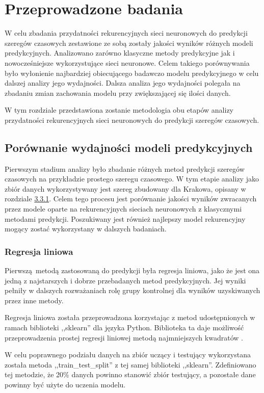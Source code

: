 \documentclass[10pt,a4paper]{article}
\begin{document}
\newpage
\section{Przeprowadzone badania}
W celu zbadania przydatności rekurencyjnych sieci neuronowych do predykcji szeregów czasowych zestawione ze sobą zostały jakości wyników różnych modeli predykcyjnych. Analizowano zarówno klasyczne metody predykcyjne jak i nowocześniejsze wykorzystujące sieci neuronowe. Celem takiego porównywania było wyłonienie najbardziej obiecującego badawczo modelu predykcyjnego w celu dalszej analizy jego wydajności. Dalsza analiza jego wydajności polegała na zbadaniu zmian zachowania modelu przy zwiększającej się ilości danych. 

W tym rozdziale przedstawiona zostanie metodologia obu etapów analizy przydatności rekurencyjnych sieci neuronowych do predykcji szeregów czasowych. 
\subsection{Porównanie wydajności modeli predykcyjnych}
Pierwszym stadium analizy było zbadanie różnych metod predykcji szeregów czasowych na przykładzie prostego szeregu czasowego. W tym etapie analizy jako zbiór danych wykorzystywany jest szereg zbudowany dla Krakowa, opisany w rozdziale \hyperlink{subsubsection.3.3.1}{3.3.1}. Celem tego procesu jest porównanie jakości wyników zwracanych przez modele oparte na rekurencyjnych sieciach neuronowych z klasycznymi metodami predykcji. Poszukiwany jest również najlepszy model rekurencyjny mogący zostać wykorzystany w dalszych badaniach. 

\subsubsection{Regresja liniowa}
Pierwszą metodą zastosowaną do predykcji była regresja liniowa, jako że jest ona jedną z najstarszych i dobrze przebadanych metod predykcyjnych. Jej wyniki pełniły w dalszych rozważaniach rolę grupy kontrolnej dla wyników uzyskiwanych przez inne metody.

Regresja liniowa została przeprowadzona korzystając z metod udostępnionych w ramach biblioteki ,,sklearn'' dla języka Python. Biblioteka ta daje możliwość przeprowadzenia prostej regresji liniowej metodą najmniejszych kwadratów \cite{sklearnLinearRegression}.

W celu poprawnego podziału danych na zbiór uczący i testujący wykorzystana została metoda ,,train\_test\_split'' z tej samej biblioteki ,,sklearn''. Zdefiniowano tej metodzie, że 20\% danych powinno stanowić zbiór testujący, a pozostałe dane powinny być użyte do uczenia modelu. 
\end{document}

